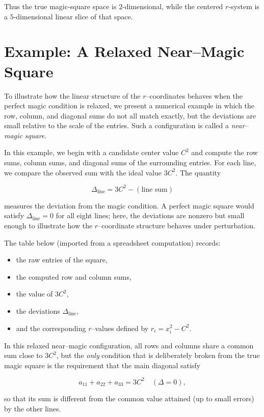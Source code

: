 \documentclass[12pt]{article}
\begin{document}
Thus the true magic-square space is $2$-dimensional, while the centered
$r$-system is a $5$-dimensional linear slice of that space.


\section*{Example: A Relaxed Near--Magic Square}

To illustrate how the linear structure of the $r$--coordinates behaves when the
perfect magic condition is relaxed, we present a numerical example in which the
row, column, and diagonal sums do not all match exactly, but the deviations are
small relative to the scale of the entries.  Such a configuration is called a
\emph{near--magic square}.

In this example, we begin with a candidate center value $C^2$ and compute the
row sums, column sums, and diagonal sums of the surrounding entries.  For each
line, we compare the observed sum with the ideal value $3C^2$.  The quantity


\[
\Delta_{\text{line}} = 3C^2 - (\text{line sum})
\]


measures the deviation from the magic condition.  A perfect magic square would
satisfy $\Delta_{\text{line}} = 0$ for all eight lines; here, the deviations
are nonzero but small enough to illustrate how the $r$--coordinate structure
behaves under perturbation.

The table below (imported from a spreadsheet computation) records:
\begin{itemize}
    \item the raw entries of the square,
    \item the computed row and column sums,
    \item the value of $3C^2$,
    \item the deviations $\Delta_{\text{line}}$,
    \item and the corresponding $r$--values defined by $r_i = x_i^2 - C^2$.
\end{itemize}

In this relaxed near--magic configuration, all rows and columns share a common
sum close to $3C^2$, but the \emph{only} condition that is deliberately broken
from the true magic square is the requirement that the main diagonal satisfy


\[
a_{11} + a_{22} + a_{33} = 3C^2 \quad (\Delta = 0),
\]


so that its sum is different from the common value attained (up to small
errors) by the other lines.
\end{document}
